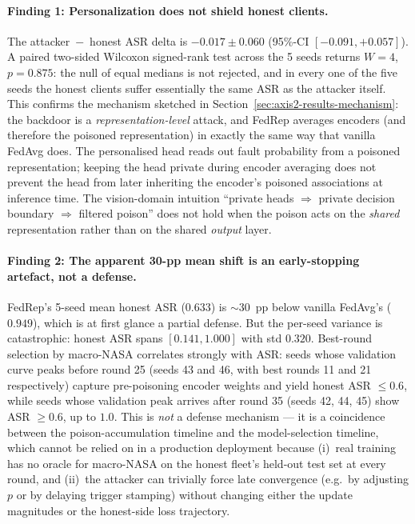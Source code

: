 \documentclass[a4paper,fleqn,doubleblind]{cas-sc}
\begin{document}
\paragraph{Finding 1: Personalization does not shield honest clients.}
The attacker~$-$~honest ASR delta is $-0.017 \pm 0.060$
(95\%-CI $[-0.091, +0.057]$). A paired two-sided Wilcoxon
signed-rank test across the 5 seeds returns $W = 4$, $p = 0.875$:
the null of equal medians is not rejected, and in every one of
the five seeds the honest clients suffer essentially the same ASR
as the attacker itself. This confirms the mechanism sketched
in Section~\ref{sec:axis2-results-mechanism}: the backdoor is a
\emph{representation-level} attack, and FedRep averages encoders
(and therefore the poisoned representation) in exactly the same way
that vanilla FedAvg does. The personalised head reads out fault
probability from a poisoned representation; keeping the head private
during encoder averaging does not prevent the head from later
inheriting the encoder's poisoned associations at inference time.
The vision-domain intuition ``private heads $\Rightarrow$ private
decision boundary $\Rightarrow$ filtered poison''
\citep{Zhang2024SARS} does not hold when the poison acts on the
\emph{shared} representation rather than on the shared \emph{output}
layer.

\paragraph{Finding 2: The apparent 30-pp mean shift is an
early-stopping artefact, not a defense.}
FedRep's 5-seed mean honest ASR ($0.633$) is $\sim 30$~pp below
vanilla FedAvg's ($0.949$), which is at first glance a partial
defense. But the per-seed variance is catastrophic: honest ASR
spans $[0.141, 1.000]$ with std $0.320$. Best-round selection by
macro-NASA correlates strongly with ASR: seeds whose validation
curve peaks before round 25 (seeds 43 and 46, with best rounds 11
and 21 respectively) capture pre-poisoning encoder weights and yield
honest ASR $\leq 0.6$, while seeds whose validation peak arrives
after round 35 (seeds 42, 44, 45) show ASR $\geq 0.6$, up to $1.0$.
This is \emph{not} a defense mechanism --- it is a coincidence
between the poison-accumulation timeline and the model-selection
timeline, which cannot be relied on in a production deployment
because (i)~real training has no oracle for macro-NASA on the
honest fleet's held-out test set at every round, and (ii)~the
attacker can trivially force late convergence (e.g.\ by adjusting
$p$ or by delaying trigger stamping) without changing either the
update magnitudes or the honest-side loss trajectory.
\end{document}
